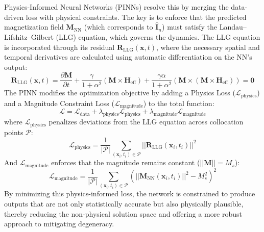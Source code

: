 \documentclass[letterpaper, 12, one column]{article}
\begin{document}
Physics-Informed Neural Networks (PINNs) resolve this by merging the data-driven loss with physical constraints. The key is to enforce that the predicted magnetization field $\mathbf{M}_{\text{NN}}$ (which corresponds to $\mathbf{\hat{I}}_n$) must satisfy the Landau--Lifshitz--Gilbert (LLG) equation, which governs the dynamics. The LLG equation is incorporated through its residual $\mathbf{R}_{\text{LLG}}(\mathbf{x}, t)$, where the necessary spatial and temporal derivatives are calculated using automatic differentiation on the NN's output:
\begin{equation}
\label{eq:llg_residual}
\mathbf{R}_{\text{LLG}}(\mathbf{x}, t) = \frac{\partial \mathbf{M}}{\partial t} + \frac{\gamma}{1+\alpha^2} (\mathbf{M} \times \mathbf{H}_{\text{eff}}) + \frac{\gamma \alpha}{1+\alpha^2} \left( \mathbf{M} \times (\mathbf{M} \times \mathbf{H}_{\text{eff}}) \right) = \mathbf{0}
\end{equation}
The PINN modifies the optimization objective by adding a Physics Loss ($\mathcal{L}_{\text{physics}}$) and a Magnitude Constraint Loss ($\mathcal{L}_{\text{magnitude}}$) to the total function:
\begin{equation}
\label{eq:pinn_total_loss}
\mathcal{L} = \mathcal{L}_{\text{data}} + \lambda_{\text{physics}} \mathcal{L}_{\text{physics}} + \lambda_{\text{magnitude}} \mathcal{L}_{\text{magnitude}}
\end{equation}
where $\mathcal{L}_{\text{physics}}$ penalizes deviations from the LLG equation across collocation points $\mathcal{P}$:
\begin{equation}
\label{eq:physics_loss_pinn}
\mathcal{L}_{\text{physics}} = \frac{1}{|\mathcal{P}|} \sum_{(\mathbf{x}_i, t_i) \in \mathcal{P}} || \mathbf{R}_{\text{LLG}}(\mathbf{x}_i, t_i) ||^2
\end{equation}
And $\mathcal{L}_{\text{magnitude}}$ enforces that the magnitude remains constant ($||\mathbf{M}|| = M_s$):
\begin{equation}
\label{eq:magnitude_loss_pinn}
\mathcal{L}_{\text{magnitude}} = \frac{1}{|\mathcal{P}|} \sum_{(\mathbf{x}_i, t_i) \in \mathcal{P}} \left( || \mathbf{M}_{\text{NN}}(\mathbf{x}_i, t_i) ||^2 - M_s^2 \right)^2
\end{equation}
By minimizing this physics-informed loss, the network is constrained to produce outputs that are not only statistically accurate but also physically plausible, thereby reducing the non-physical solution space and offering a more robust approach to mitigating degeneracy.
\end{document}
